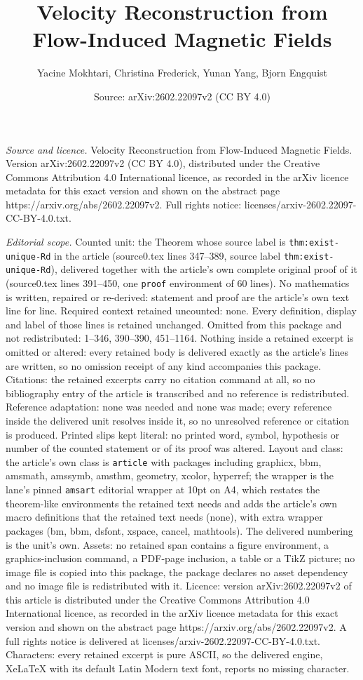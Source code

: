 \documentclass[10pt,a4paper]{amsart}
\title[Velocity Reconstruction from Flow-Induced Magnetic Fields]{Velocity Reconstruction from Flow-Induced Magnetic Fields}
\author{Yacine Mokhtari, Christina Frederick, Yunan Yang, Bjorn Engquist}
\date{Source: arXiv:2602.22097v2 (CC BY 4.0)}
\begin{document}
\maketitle

\noindent\emph{Source and licence.} Velocity Reconstruction from Flow-Induced Magnetic Fields. Version arXiv:2602.22097v2 (CC BY 4.0), distributed under the Creative Commons Attribution 4.0 International licence, as recorded in the arXiv licence metadata for this exact version and shown on the abstract page https://arxiv.org/abs/2602.22097v2. Full rights notice: licenses/arxiv-2602.22097-CC-BY-4.0.txt.\par\smallskip

\noindent\textit{Editorial scope.} Counted unit: the Theorem whose source label is \texttt{thm:exist-unique-Rd} in the article (source0.tex lines 347--389, source label \texttt{thm:exist-unique-Rd}), delivered together with the article's own complete original proof of it (source0.tex lines 391--450, one \texttt{proof} environment of 60 lines). No mathematics is written, repaired or re-derived: statement and proof are the article's own text line for line. Required context retained uncounted: none. Every definition, display and label of those lines is retained unchanged. Omitted from this package and not redistributed: 1--346, 390--390, 451--1164. Nothing inside a retained excerpt is omitted or altered: every retained body is delivered exactly as the article's lines are written, so no omission receipt of any kind accompanies this package. Citations: the retained excerpts carry no citation command at all, so no bibliography entry of the article is transcribed and no reference is redistributed. Reference adaptation: none was needed and none was made; every reference inside the delivered unit resolves inside it, so no unresolved reference or citation is produced. Printed slips kept literal: no printed word, symbol, hypothesis or number of the counted statement or of its proof was altered. Layout and class: the article's own class is \texttt{article} with packages including graphicx, bbm, amsmath, amssymb, amsthm, geometry, xcolor, hyperref; the wrapper is the lane's pinned \texttt{amsart} editorial wrapper at 10pt on A4, which restates the theorem-like environments the retained text needs and adds the article's own macro definitions that the retained text needs (none), with extra wrapper packages (bm, bbm, dsfont, xspace, cancel, mathtools). The delivered numbering is the unit's own. Assets: no retained span contains a figure environment, a graphics-inclusion command, a PDF-page inclusion, a table or a TikZ picture; no image file is copied into this package, the package declares no asset dependency and no image file is redistributed with it. Licence: version arXiv:2602.22097v2 of this article is distributed under the Creative Commons Attribution 4.0 International licence, as recorded in the arXiv licence metadata for this exact version and shown on the abstract page https://arxiv.org/abs/2602.22097v2. A full rights notice is delivered at licenses/arxiv-2602.22097-CC-BY-4.0.txt. Characters: every retained excerpt is pure ASCII, so the delivered engine, XeLaTeX with its default Latin Modern text font, reports no missing character.
\end{document}
